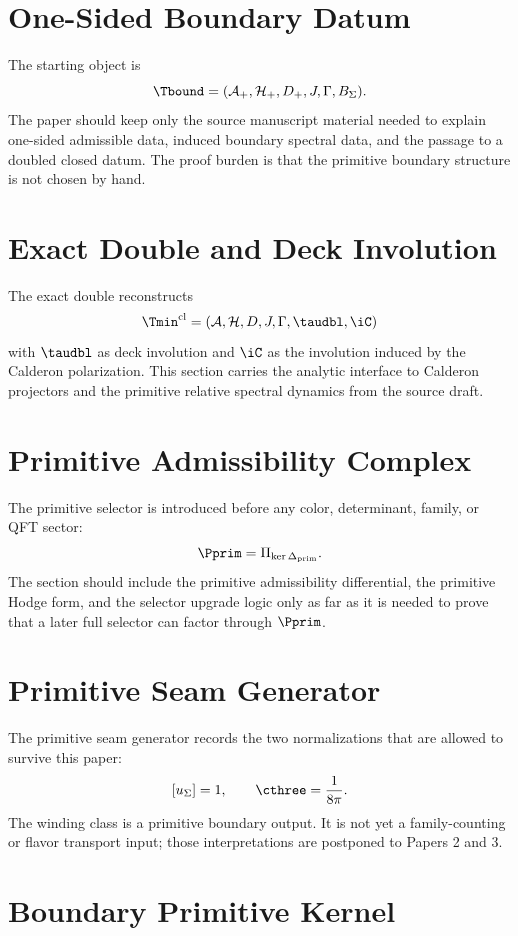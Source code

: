 \section{One-Sided Boundary Datum}

The starting object is
\[
\Tbound=(\mathcal A_+,\mathcal H_+,D_+,J,\Gamma,B_\Sigma).
\]
The paper should keep only the source manuscript material needed to explain one-sided admissible
data, induced boundary spectral data, and the passage to a doubled closed datum. The proof burden is
that the primitive boundary structure is not chosen by hand.

\section{Exact Double and Deck Involution}

The exact double reconstructs
\[
\Tmin^{\mathrm{cl}}=(\mathcal A,\mathcal H,D,J,\Gamma,\taudbl,\iC)
\]
with $\taudbl$ as deck involution and $\iC$ as the involution induced by the Calderon polarization.
This section carries the analytic interface to Calderon projectors and the primitive relative
spectral dynamics from the source draft.

\section{Primitive Admissibility Complex}

The primitive selector is introduced before any color, determinant, family, or QFT sector:
\[
\Pprim=\Pi_{\ker\Delta_{\mathrm{prim}}}.
\]
The section should include the primitive admissibility differential, the primitive Hodge form, and
the selector upgrade logic only as far as it is needed to prove that a later full selector can
factor through $\Pprim$.

\section{Primitive Seam Generator}

The primitive seam generator records the two normalizations that are allowed to survive this paper:
\[
[u_\Sigma]=1,
\qquad
\cthree=\frac{1}{8\pi}.
\]
The winding class is a primitive boundary output. It is not yet a family-counting or flavor
transport input; those interpretations are postponed to Papers 2 and 3.

\section{Boundary Primitive Kernel}

